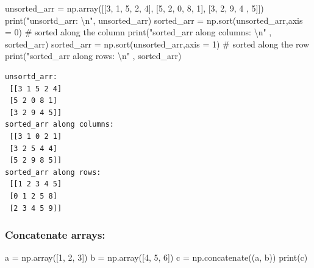 \documentclass[
  letterpaper,
  DIV=11,
  numbers=noendperiod]{scrreprt}
\newenvironment{Shaded}{\begin{snugshade}}{\end{snugshade}}
\newcommand{\BuiltInTok}[1]{\textcolor[rgb]{0.00,0.23,0.31}{#1}}
\newcommand{\CharTok}[1]{\textcolor[rgb]{0.13,0.47,0.30}{#1}}
\newcommand{\CommentTok}[1]{\textcolor[rgb]{0.37,0.37,0.37}{#1}}
\newcommand{\DecValTok}[1]{\textcolor[rgb]{0.68,0.00,0.00}{#1}}
\newcommand{\NormalTok}[1]{\textcolor[rgb]{0.00,0.23,0.31}{#1}}
\newcommand{\OperatorTok}[1]{\textcolor[rgb]{0.37,0.37,0.37}{#1}}
\newcommand{\StringTok}[1]{\textcolor[rgb]{0.13,0.47,0.30}{#1}}
\begin{document}
\begin{Shaded}
\begin{Highlighting}[]
\NormalTok{unsorted\_arr }\OperatorTok{=}\NormalTok{ np.array([[}\DecValTok{3}\NormalTok{, }\DecValTok{1}\NormalTok{, }\DecValTok{5}\NormalTok{, }\DecValTok{2}\NormalTok{, }\DecValTok{4}\NormalTok{], [}\DecValTok{5}\NormalTok{, }\DecValTok{2}\NormalTok{, }\DecValTok{0}\NormalTok{, }\DecValTok{8}\NormalTok{, }\DecValTok{1}\NormalTok{], [}\DecValTok{3}\NormalTok{, }\DecValTok{2}\NormalTok{, }\DecValTok{9}\NormalTok{, }\DecValTok{4}\NormalTok{ , }\DecValTok{5}\NormalTok{]])}
\BuiltInTok{print}\NormalTok{(}\StringTok{"unsortd\_arr: }\CharTok{\textbackslash{}n}\StringTok{"}\NormalTok{, unsorted\_arr)}
\NormalTok{sorted\_arr }\OperatorTok{=}\NormalTok{ np.sort(unsorted\_arr,axis }\OperatorTok{=} \DecValTok{0}\NormalTok{) }\CommentTok{\# sorted along the column}
\BuiltInTok{print}\NormalTok{(}\StringTok{"sorted\_arr along columns: }\CharTok{\textbackslash{}n}\StringTok{"}\NormalTok{ , sorted\_arr)}
\NormalTok{sorted\_arr }\OperatorTok{=}\NormalTok{ np.sort(unsorted\_arr,axis }\OperatorTok{=} \DecValTok{1}\NormalTok{) }\CommentTok{\# sorted along the row}
\BuiltInTok{print}\NormalTok{(}\StringTok{"sorted\_arr along rows: }\CharTok{\textbackslash{}n}\StringTok{"}\NormalTok{ , sorted\_arr)}
\end{Highlighting}
\end{Shaded}

\begin{verbatim}
unsortd_arr: 
 [[3 1 5 2 4]
 [5 2 0 8 1]
 [3 2 9 4 5]]
sorted_arr along columns: 
 [[3 1 0 2 1]
 [3 2 5 4 4]
 [5 2 9 8 5]]
sorted_arr along rows: 
 [[1 2 3 4 5]
 [0 1 2 5 8]
 [2 3 4 5 9]]
\end{verbatim}

\subsubsection*{Concatenate arrays:}\label{concatenate-arrays}

\begin{Shaded}
\begin{Highlighting}[]
\NormalTok{a }\OperatorTok{=}\NormalTok{ np.array([}\DecValTok{1}\NormalTok{, }\DecValTok{2}\NormalTok{, }\DecValTok{3}\NormalTok{]) }
\NormalTok{b }\OperatorTok{=}\NormalTok{ np.array([}\DecValTok{4}\NormalTok{, }\DecValTok{5}\NormalTok{, }\DecValTok{6}\NormalTok{])}
\NormalTok{c }\OperatorTok{=}\NormalTok{ np.concatenate((a, b))}
\BuiltInTok{print}\NormalTok{(c)}
\end{Highlighting}
\end{Shaded}
\end{document}
